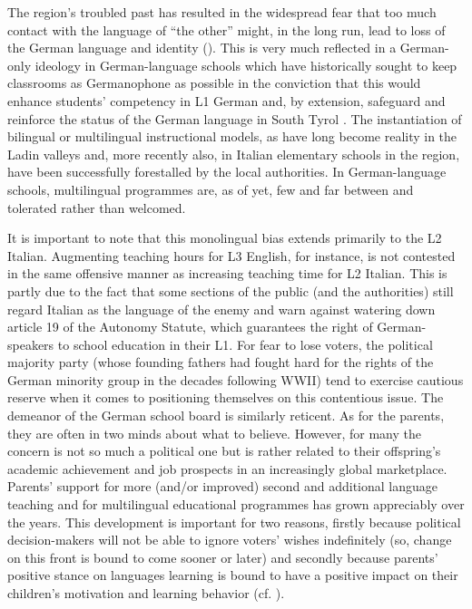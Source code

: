 \documentclass[output=paper]{../langscibook}
\begin{document}
The region’s troubled past has resulted in the widespread fear that too much contact with the language of ``the other'' might, in the long run, lead to loss of the German language and identity (\citealt{DeAngelis2012}). This is very much reflected in a German-only ideology in German-language schools which have historically sought to keep classrooms as Germanophone as possible in the conviction that this would enhance students’ competency in L1 German and, by extension, safeguard and reinforce the status of the German language in South Tyrol \citep{Egger1977}. The instantiation of bilingual or multilingual instructional models, as have long become reality in the Ladin valleys and, more recently also, in Italian elementary schools in the region, have been successfully forestalled by the local authorities. In German-language schools, multilingual programmes are, as of yet, few and far between and tolerated rather than welcomed. 

It is important to note that this monolingual bias extends primarily to the L2 Italian. Augmenting teaching hours for L3 English, for instance, is not contested in the same offensive manner as increasing teaching time for L2 Italian. This is partly due to the fact that some sections of the public (and the authorities) still regard Italian as the language of the enemy and warn against watering down article 19 of the Autonomy Statute, which guarantees the right of German-speakers to school education in their L1. For fear to lose voters, the political majority party (whose founding fathers had fought hard for the rights of the German minority group in the decades following WWII) tend to exercise cautious reserve when it comes to positioning themselves on this contentious issue. The demeanor of the German school board is similarly reticent. As for the parents, they are often in two minds about what to believe. However, for many the concern is not so much a political one but is rather related to their offspring’s academic achievement and job prospects in an increasingly global marketplace. Parents’ support for more (and/or improved) second and additional language teaching and for multilingual educational programmes has grown appreciably over the years. This development is important for two reasons, firstly because political decision-makers will not be able to ignore voters’ wishes indefinitely (so, change on this front is bound to come sooner or later) and secondly because parents’ positive stance on languages learning is bound to have a positive impact on their children’s motivation and learning behavior (cf. \citealt{Gardner1985}).
\end{document}
